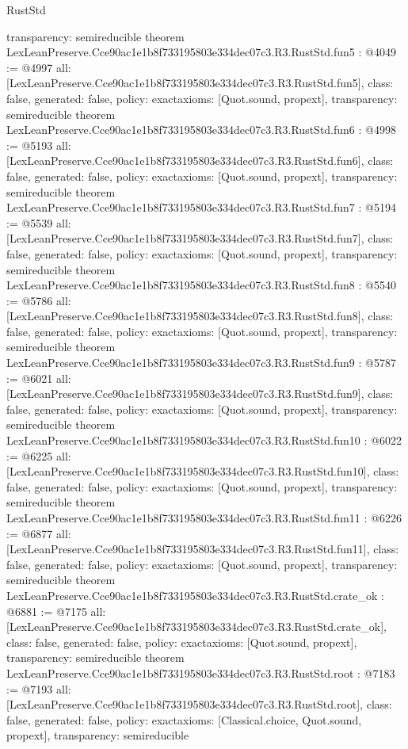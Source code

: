 \begin{lexlean}{RustStd}
\begin{coremodule}
{  transparency: semireducible
}
theorem LexLeanPreserve.Cce90ac1e1b8f733195803e334dec07c3.R3.RustStd.fun5 : @4049 := @4997 {
  all: [LexLeanPreserve.Cce90ac1e1b8f733195803e334dec07c3.R3.RustStd.fun5],
  class: false,
  generated: false,
  policy: exact{axioms: [Quot.sound, propext]},
  transparency: semireducible
}
theorem LexLeanPreserve.Cce90ac1e1b8f733195803e334dec07c3.R3.RustStd.fun6 : @4998 := @5193 {
  all: [LexLeanPreserve.Cce90ac1e1b8f733195803e334dec07c3.R3.RustStd.fun6],
  class: false,
  generated: false,
  policy: exact{axioms: [Quot.sound, propext]},
  transparency: semireducible
}
theorem LexLeanPreserve.Cce90ac1e1b8f733195803e334dec07c3.R3.RustStd.fun7 : @5194 := @5539 {
  all: [LexLeanPreserve.Cce90ac1e1b8f733195803e334dec07c3.R3.RustStd.fun7],
  class: false,
  generated: false,
  policy: exact{axioms: [Quot.sound, propext]},
  transparency: semireducible
}
theorem LexLeanPreserve.Cce90ac1e1b8f733195803e334dec07c3.R3.RustStd.fun8 : @5540 := @5786 {
  all: [LexLeanPreserve.Cce90ac1e1b8f733195803e334dec07c3.R3.RustStd.fun8],
  class: false,
  generated: false,
  policy: exact{axioms: [Quot.sound, propext]},
  transparency: semireducible
}
theorem LexLeanPreserve.Cce90ac1e1b8f733195803e334dec07c3.R3.RustStd.fun9 : @5787 := @6021 {
  all: [LexLeanPreserve.Cce90ac1e1b8f733195803e334dec07c3.R3.RustStd.fun9],
  class: false,
  generated: false,
  policy: exact{axioms: [Quot.sound, propext]},
  transparency: semireducible
}
theorem LexLeanPreserve.Cce90ac1e1b8f733195803e334dec07c3.R3.RustStd.fun10 : @6022 := @6225 {
  all: [LexLeanPreserve.Cce90ac1e1b8f733195803e334dec07c3.R3.RustStd.fun10],
  class: false,
  generated: false,
  policy: exact{axioms: [Quot.sound, propext]},
  transparency: semireducible
}
theorem LexLeanPreserve.Cce90ac1e1b8f733195803e334dec07c3.R3.RustStd.fun11 : @6226 := @6877 {
  all: [LexLeanPreserve.Cce90ac1e1b8f733195803e334dec07c3.R3.RustStd.fun11],
  class: false,
  generated: false,
  policy: exact{axioms: [Quot.sound, propext]},
  transparency: semireducible
}
theorem LexLeanPreserve.Cce90ac1e1b8f733195803e334dec07c3.R3.RustStd.crate_ok : @6881 := @7175 {
  all: [LexLeanPreserve.Cce90ac1e1b8f733195803e334dec07c3.R3.RustStd.crate_ok],
  class: false,
  generated: false,
  policy: exact{axioms: [Quot.sound, propext]},
  transparency: semireducible
}
theorem LexLeanPreserve.Cce90ac1e1b8f733195803e334dec07c3.R3.RustStd.root : @7183 := @7193 {
  all: [LexLeanPreserve.Cce90ac1e1b8f733195803e334dec07c3.R3.RustStd.root],
  class: false,
  generated: false,
  policy: exact{axioms: [Classical.choice, Quot.sound, propext]},
  transparency: semireducible
}


\end{coremodule}
\end{lexlean}
